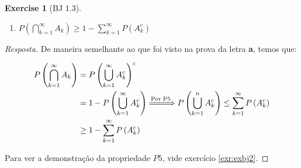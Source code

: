 \documentclass[
]{article}
\providecommand{\tightlist}{%
  \setlength{\itemsep}{0pt}\setlength{\parskip}{0pt}}
\theoremstyle{definition}
\theoremstyle{definition}
\theoremstyle{definition}
\newtheorem{exercise}{Exercise}[section]
\theoremstyle{definition}
\theoremstyle{remark}
\begin{document}
\begin{exercise}[BJ 1.3]
\begin{enumerate}
\def\labelenumi{\alph{enumi})}
\setcounter{enumi}{2}
\tightlist
\item
  \(P\left(\bigcap_{k=1}^{\infty}A_{k}\right) \ge 1 - \sum_{k=1}^{\infty}P(A_{k}^{c})\)
\end{enumerate}

\begin{proof}[Resposta]
De maneira semelhante ao que foi visto na prova da letra \textbf{a}, temos que:

\begin{align*}
P\left(\bigcap_{k=1}^{\infty}A_{k}\right) &= P\left(\bigcup_{k=1}^{\infty}A_{k}^{c}\right)^{c} \\
&= 1 - P\left(\bigcup_{k=1}^{\infty}A_{k}^{c}\right) \xRightarrow[]{\text{Por P5}} P\left(\bigcup_{k=1}^{n}A_{k}^{c}\right) \le \sum_{k=1}^{\infty}P\left(A_{k}^{c}\right) \\
&\ge 1 - \sum_{k=1}^{\infty}P\left(A_{k}^{c}\right)
\end{align*}

Para ver a demonstração da propriedade \(P5\), vide exercício \ref{exr:exbj2}.
\end{proof}

\end{exercise}
\end{document}
